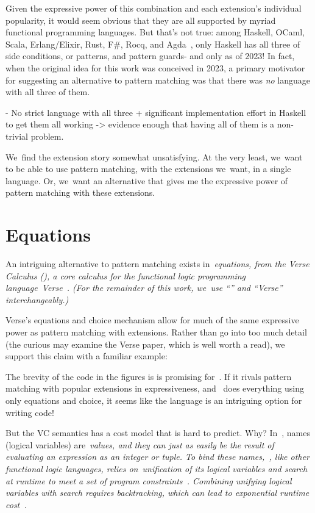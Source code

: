 \documentclass[manuscript,screen,12pt, nonacm]{acmart}
\begin{document}
    Given the expressive power of this combination and each extension's
    individual popularity, it would seem obvious that they are all supported by
    myriad functional programming languages. But that's not true: among Haskell,
    OCaml, Scala, Erlang/Elixir, Rust, F\#, Rocq, and Agda~\citep{haskell,
    ocaml, scala, erlang, elixir, rust, fsharp, agda}, only Haskell has all
    three of side conditions, or patterns, and pattern guards- and only as of
    2023! In fact, when the original idea for this work was conceived in 2023, a
    primary motivator for suggesting an alternative to pattern matching was that
    there was \textit{no} language with all three of them. 

    - No strict language with all three + significant implementation effort in
    Haskell to get them all working -> evidence enough that having all of them
    is a non-trivial problem. 
    
    We~find the extension story somewhat unsatisfying. At the very least,
    we~want to be able to use pattern matching, with the extensions we~want, in
    a single language. Or, we~want an alternative that gives me the expressive
    power of pattern matching with these extensions. 

        \section{Equations}

    An intriguing alternative to pattern matching exists in~\it{equations}, from
    the Verse Calculus (\VC), a core calculus for the functional logic
    programming language~\it{Verse}~\citep{antoy2010functional,
    hanus2013functional, verse}. (For the remainder of this work, we~use “\VC”
    and “Verse” interchangeably.)

    Verse's equations and choice mechanism allow for much of the same expressive
    power as pattern matching with extensions. Rather than go into too much
    detail (the curious may examine the Verse paper, which is well worth a
    read), we support this claim with a familiar example: 



    The brevity of the code in the figures is is promising for~\VC. If it rivals
    pattern matching with popular extensions in expressiveness, and~\VC
    does everything using only equations and choice, it seems like the language
    is an intriguing option for writing code! 


    But the VC semantics has a cost model that is hard to predict. Why? In~\VC,
    names (logical variables) are~\it{values}, and they can just as easily be
    the result of evaluating an expression as an integer or tuple. To bind these
    names,~\VC, like other functional logic languages, relies
    on~\it{unification} of its logical variables and \it{search} at runtime to
    meet a set of program constraints~\citep{antoy2010functional,
    hanus2013functional}. Combining unifying logical variables with search
    requires backtracking, which can lead to exponential runtime
    cost~\citep{hanus2013functional, wadler1985replace, clark1982introduction}. 
\end{document}
